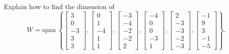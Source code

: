 \documentclass{article}
\begin{document}
\begin{exerciseStatement}
    Explain how to find the dimension of
\[W=\mathrm{span}\ \left\{\left[\begin{array}{r}
3 \\
0 \\
-3 \\
3 \\
3
\end{array}\right] , \left[\begin{array}{r}
0 \\
1 \\
-4 \\
1 \\
1
\end{array}\right] , \left[\begin{array}{r}
-3 \\
-4 \\
-2 \\
-2 \\
2
\end{array}\right] , \left[\begin{array}{r}
-4 \\
0 \\
0 \\
-3 \\
1
\end{array}\right] , \left[\begin{array}{r}
2 \\
-3 \\
-3 \\
-2 \\
-3
\end{array}\right] , \left[\begin{array}{r}
-1 \\
9 \\
3 \\
-1 \\
-5
\end{array}\right]\right\}.\]



  
\end{exerciseStatement}
\end{document}
